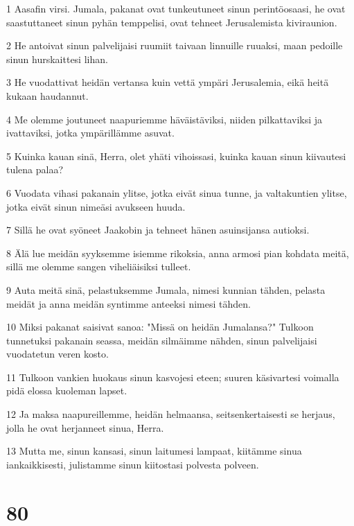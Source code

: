 \par 1 Aasafin virsi. Jumala, pakanat ovat tunkeutuneet sinun perintöosaasi, he ovat saastuttaneet sinun pyhän temppelisi, ovat tehneet Jerusalemista kiviraunion.
\par 2 He antoivat sinun palvelijaisi ruumiit taivaan linnuille ruuaksi, maan pedoille sinun hurskaittesi lihan.
\par 3 He vuodattivat heidän vertansa kuin vettä ympäri Jerusalemia, eikä heitä kukaan haudannut.
\par 4 Me olemme joutuneet naapuriemme häväistäviksi, niiden pilkattaviksi ja ivattaviksi, jotka ympärillämme asuvat.
\par 5 Kuinka kauan sinä, Herra, olet yhäti vihoissasi, kuinka kauan sinun kiivautesi tulena palaa?
\par 6 Vuodata vihasi pakanain ylitse, jotka eivät sinua tunne, ja valtakuntien ylitse, jotka eivät sinun nimeäsi avukseen huuda.
\par 7 Sillä he ovat syöneet Jaakobin ja tehneet hänen asuinsijansa autioksi.
\par 8 Älä lue meidän syyksemme isiemme rikoksia, anna armosi pian kohdata meitä, sillä me olemme sangen viheliäisiksi tulleet.
\par 9 Auta meitä sinä, pelastuksemme Jumala, nimesi kunnian tähden, pelasta meidät ja anna meidän syntimme anteeksi nimesi tähden.
\par 10 Miksi pakanat saisivat sanoa: "Missä on heidän Jumalansa?" Tulkoon tunnetuksi pakanain seassa, meidän silmäimme nähden, sinun palvelijaisi vuodatetun veren kosto.
\par 11 Tulkoon vankien huokaus sinun kasvojesi eteen; suuren käsivartesi voimalla pidä elossa kuoleman lapset.
\par 12 Ja maksa naapureillemme, heidän helmaansa, seitsenkertaisesti se herjaus, jolla he ovat herjanneet sinua, Herra.
\par 13 Mutta me, sinun kansasi, sinun laitumesi lampaat, kiitämme sinua iankaikkisesti, julistamme sinun kiitostasi polvesta polveen.

\chapter{80}

